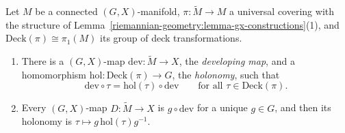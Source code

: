 \begin{theorem}\label{riemannian-geometry:theorem-developing-map}
Let $M$ be a connected $(G, X)$-manifold, $\pi \colon \widetilde{M} \to M$ a universal covering with the structure of Lemma~\ref{riemannian-geometry:lemma-gx-constructions}(1), and $\mathrm{Deck}(\pi) \cong \pi_1(M)$ its group of
deck transformations.
\begin{enumerate}
\item There is a $(G, X)$-map $\mathrm{dev} \colon \widetilde{M} \to X$, the \emph{developing map}, and a homomorphism $\mathrm{hol} \colon \mathrm{Deck}(\pi) \to G$, the \emph{holonomy}, such that
\[
\mathrm{dev} \circ \tau = \mathrm{hol}(\tau) \circ \mathrm{dev} \qquad \text{for all } \tau \in \mathrm{Deck}(\pi).
\]
\item Every $(G, X)$-map $D \colon \widetilde{M} \to X$ is $g \circ \mathrm{dev}$ for a unique $g \in G$, and then its holonomy is $\tau \mapsto g\,\mathrm{hol}(\tau)g^{-1}$.
\end{enumerate}
\end{theorem}

